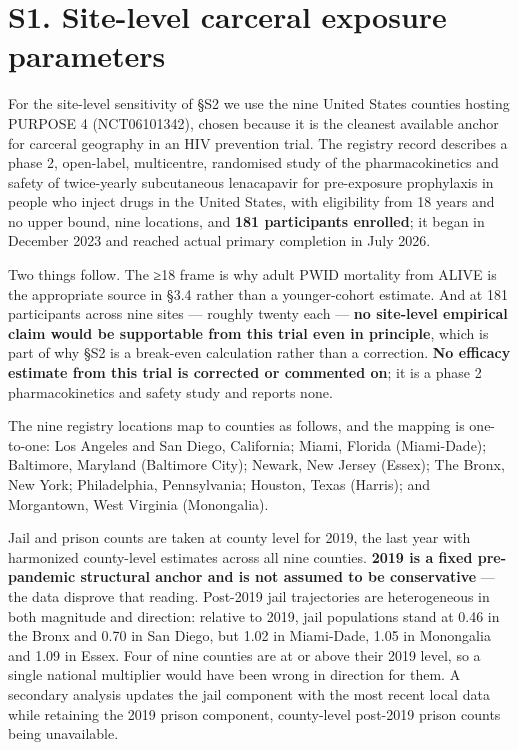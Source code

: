 \section{S1. Site-level carceral exposure parameters}

For the site-level sensitivity of §S2 we use the nine United States counties hosting PURPOSE 4 (NCT06101342), chosen because it is the cleanest available anchor for carceral geography in an HIV prevention trial. The registry record describes a phase 2, open-label, multicentre, randomised study of the pharmacokinetics and safety of twice-yearly subcutaneous lenacapavir for pre-exposure prophylaxis in people who inject drugs in the United States, with eligibility from 18 years and no upper bound, nine locations, and \textbf{181 participants enrolled}; it began in December 2023 and reached actual primary completion in July 2026.

Two things follow. The ≥18 frame is why adult PWID mortality from ALIVE is the appropriate source in §3.4 rather than a younger-cohort estimate. And at 181 participants across nine sites --- roughly twenty each --- \textbf{no site-level empirical claim would be supportable from this trial even in principle}, which is part of why §S2 is a break-even calculation rather than a correction. \textbf{No efficacy estimate from this trial is corrected or commented on}; it is a phase 2 pharmacokinetics and safety study and reports none.

The nine registry locations map to counties as follows, and the mapping is one-to-one: Los Angeles and San Diego, California; Miami, Florida (Miami-Dade); Baltimore, Maryland (Baltimore City); Newark, New Jersey (Essex); The Bronx, New York; Philadelphia, Pennsylvania; Houston, Texas (Harris); and Morgantown, West Virginia (Monongalia).

Jail and prison counts are taken at county level for 2019, the last year with harmonized county-level estimates across all nine counties. \textbf{2019 is a fixed pre-pandemic structural anchor and is not assumed to be conservative} --- the data disprove that reading. Post-2019 jail trajectories are heterogeneous in both magnitude and direction: relative to 2019, jail populations stand at 0.46 in the Bronx and 0.70 in San Diego, but 1.02 in Miami-Dade, 1.05 in Monongalia and 1.09 in Essex. Four of nine counties are at or above their 2019 level, so a single national multiplier would have been wrong in direction for them. A secondary analysis updates the jail component with the most recent local data while retaining the 2019 prison component, county-level post-2019 prison counts being unavailable.

